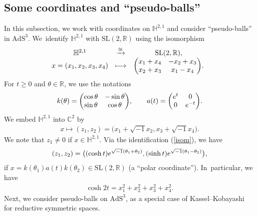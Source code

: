 \documentclass[11pt]{article}
\numberwithin{equation}{section}
\numberwithin{equation}{section}
\begin{document}
\subsection{Some coordinates and ``pseudo-balls''}
In this subsection, we work with coordinates on $\mathbb{H}^{2,1}$ and
consider ``pseudo-balls'' in $\mathrm{AdS}^{3}$. We~identify
$\mathbb{H}^{2,1}$ with $\mathrm{SL}(2,\mathbb{R})$ using the isomorphism
\begin{align}
\begin{array}{@{}ccc}
\mathbb{H}^{2,1} & \xrightarrow{\cong} & \mathrm{SL}(2,\mathbb{R}), \\
x=(x_1,x_2,x_3,x_4) & \longmapsto & \begin{pmatrix}
x_1 + x_4 & -x_2 + x_3 \\
x_2 + x_3 & x_1 -x_4
\end{pmatrix}\!.\label{isom}
\end{array}
\end{align}
For $t\geq0$ and $\theta\in\mathbb{R}$, we use the notations
\begin{gather}
\label{k-a}
k(\theta) = \begin{pmatrix}
\cos\theta & -\sin\theta \\
\sin\theta & \cos\theta
\end{pmatrix}\!,\qquad
a(t) = \begin{pmatrix}
{\rm e}^t & 0 \\
0 & {\rm e}^{-t}
\end{pmatrix}\!.
\end{gather}
We embed $\mathbb{H}^{2,1}$ into $\mathbb{C}^{2}$ by
\begin{gather}
\label{embed}
x\mapsto (z_1,z_2) = \big(x_1 + \sqrt{-1}x_2, x_3 + \sqrt{-1}x_4\big).
\end{gather}
We note that $z_{1}\neq0$ if $x\in\mathbb{H}^{2,1}$.
Via the identification (\ref{isom}), we have
\begin{gather}
\label{polar}
(z_1,z_2) = \big((\cosh t){\rm e}^{\sqrt{-1}(\theta_1+\theta_2)},
(\sinh t){\rm e}^{\sqrt{-1}(\theta_1-\theta_2)}\big),
\end{gather}
if $x = k(\theta_1)a(t)k(\theta_2) \in \mathrm{SL}(2,\mathbb{R})$
(a ``polar coordinate''). In~particular, we have
\begin{gather*}
\cosh 2t = x_1^2 + x_2^2 + x_3^2 + x_4^2.
\end{gather*}
Next, we consider pseudo-balls on $\mathrm{AdS}^3$, as a special case of
Kassel--Kobayashi~\cite{KaKob16} for
reductive symmetric spaces.
\end{document}
